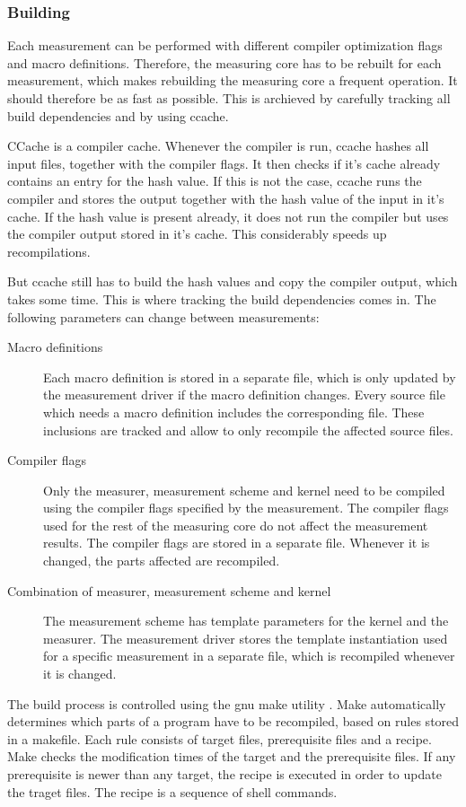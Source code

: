 \documentclass[a4paper,12pt]{article}
\newcommand{\file}[1]{}
\begin{document}
\subsubsection{Building}
Each measurement can be performed with different compiler optimization flags and macro definitions. Therefore, the measuring core has to be rebuilt for each measurement, which makes rebuilding the measuring core a frequent operation. It should therefore be as fast as possible. This is archieved by carefully tracking all build dependencies and by using ccache. 

CCache is a compiler cache. Whenever the compiler is run, ccache hashes all input files, together with the compiler flags. It then checks if it's cache already contains an entry for the hash value. If this is not the case, ccache runs the compiler and stores the output together with the hash value of the input in it's cache. If the hash value is present already, it does not run the compiler but uses the compiler output stored in it's cache. This considerably speeds up recompilations.

But ccache still has to build the hash values and copy the compiler output, which takes some time. This is where tracking the build dependencies comes in. The following parameters can change between measurements:
\begin{description}
\item[Macro definitions]
Each macro definition is stored in a separate file, which is only updated by the measurement driver if the macro definition changes. Every source file which needs a macro definition includes the corresponding file. These inclusions are tracked and allow to only recompile the affected source files.
\item[Compiler flags] 
Only the measurer, measurement scheme and kernel need to be compiled using the compiler flags specified by the measurement. The compiler flags used for the rest of the measuring core do not affect the measurement results. The compiler flags are stored in a separate file. Whenever it is changed, the parts affected are recompiled.
\item[Combination of measurer, measurement scheme and kernel]
The measurement scheme has template parameters for the kernel and the measurer. The measurement driver stores the template instantiation used for a specific measurement in a separate file, which is recompiled whenever it is changed.
\end{description}

\file{measuringCore/makefile}
The build process is controlled using the gnu make utility \cite{make}. Make automatically determines which parts of a program have to be recompiled, based on rules stored in a makefile. Each rule consists of target files, prerequisite files and a recipe. Make checks the modification times of the target and the prerequisite files. If any prerequisite is newer than any target, the recipe is executed in order to update the traget files. The recipe is a sequence of shell commands.
\end{document}
